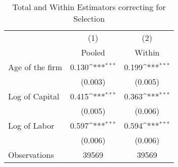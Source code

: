 \begin{table}[htbp]\centering
\def\sym#1{\ifmmode^{#1}\else\(^{#1}\)\fi}
\caption{Total and Within Estimators correcting for Selection}
\begin{tabular}{l*{2}{c}}
\toprule
                    &\multicolumn{1}{c}{(1)}&\multicolumn{1}{c}{(2)}\\
                    &\multicolumn{1}{c}{Pooled}&\multicolumn{1}{c}{Within}\\
\midrule
Age of the firm     &       0.130\sym{***}&       0.199\sym{***}\\
                    &     (0.003)         &     (0.005)         \\
\addlinespace
Log of Capital      &       0.415\sym{***}&       0.363\sym{***}\\
                    &     (0.005)         &     (0.006)         \\
\addlinespace
Log of Labor        &       0.597\sym{***}&       0.594\sym{***}\\
                    &     (0.006)         &     (0.006)         \\
\midrule
Observations        &       39569         &       39569         \\
\bottomrule
\end{tabular}
\end{table}

